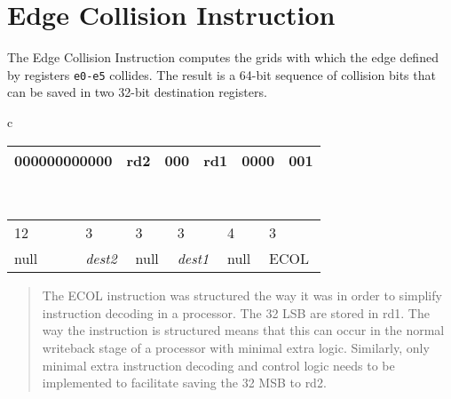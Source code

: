 \section{Edge Collision Instruction}
The Edge Collision Instruction computes the grids with which the edge defined by registers \texttt{e0-e5} collides. The result is a 64-bit sequence of collision bits that can be saved in two 32-bit destination registers.

\begin{table}[H]
\begin{centering}
\begin{tabular}{c}
    \begin{tabular}{|m{0.2\linewidth}|m{0.1\linewidth}|m{0.1\linewidth}|m{0.1\linewidth}|m{0.1\linewidth}|m{0.1\linewidth}|}
    \hline
    \hspace*{0.5cm}000000000000 & \hspace*{0.5cm}rd2  & \hspace*{0.5cm}000  & \hspace*{0.5cm}rd1  & \hspace*{0.5cm}0000  & \hspace*{0.5cm}001  \\
    \hline
    \end{tabular} \\
    \begin{tabular}{m{0.2\linewidth}m{0.1\linewidth}m{0.1\linewidth}m{0.1\linewidth}m{0.1\linewidth}m{0.1\linewidth}}
    \hspace*{1.5cm}12 & \hspace*{0.5cm}3  & \hspace*{0.5cm}3  & \hspace*{0.5cm}3  & \hspace*{0.5cm}4  & \hspace*{0.5cm}3  \\
    \hspace*{1.3cm}null &  \hspace*{0.5cm}\textit{dest2} & \hspace*{0.5cm}null  & \hspace*{0.5cm}\textit{dest1}  &  \hspace*{0.5cm}null & \hspace*{0.25cm}ECOL  \\
    \end{tabular}
\end{tabular}
\end{centering}
\end{table}

\begin{quote}{}
    The ECOL instruction was structured the way it was in order to simplify instruction decoding in a processor. The 32 \gls{LSB} are stored in rd1. The way the instruction is structured means that this can occur in the normal writeback stage of a processor with minimal extra logic. Similarly, only minimal extra instruction decoding and control logic needs to be implemented to facilitate saving the 32 \gls{MSB} to rd2.
\end{quote}
